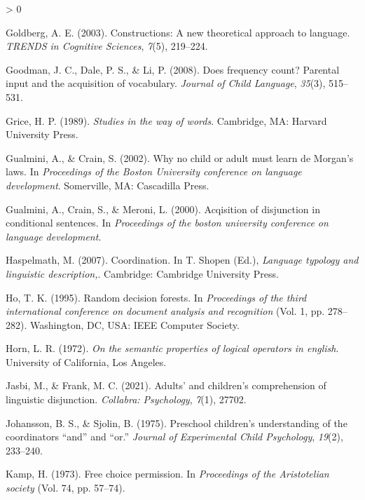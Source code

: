 \documentclass[
  english,
  ,man,floatsintext]{apa6}
\newlength{\cslhangindent}
\newenvironment{CSLReferences}[2] %
 {%
  \setlength{\parindent}{0pt}
  \ifodd #1 \everypar{\setlength{\hangindent}{\cslhangindent}}\ignorespaces\fi
  \ifnum #2 > 0
  \setlength{\parskip}{#2\baselineskip}
  \fi
 }%
 {}
\begin{document}
\begin{CSLReferences}{1}{0}
\leavevmode\hypertarget{ref-goldberg2010constructions}{}%
Goldberg, A. E. (2003). Constructions: A new theoretical approach to language. \emph{{TRENDS} in {C}ognitive {S}ciences}, \emph{7}(5), 219--224.

\leavevmode\hypertarget{ref-goodman2008does}{}%
Goodman, J. C., Dale, P. S., \& Li, P. (2008). Does frequency count? Parental input and the acquisition of vocabulary. \emph{Journal of Child Language}, \emph{35}(3), 515--531.

\leavevmode\hypertarget{ref-grice1989studies}{}%
Grice, H. P. (1989). \emph{Studies in the way of words}. Cambridge, MA: Harvard University Press.

\leavevmode\hypertarget{ref-gualminicrain2002}{}%
Gualmini, A., \& Crain, S. (2002). Why no child or adult must learn de {M}organ's laws. In \emph{Proceedings of the {B}oston {U}niversity conference on language development}. Somerville, MA: Cascadilla Press.

\leavevmode\hypertarget{ref-gualmini2000}{}%
Gualmini, A., Crain, S., \& Meroni, L. (2000). Acqisition of disjunction in conditional sentences. In \emph{Proceedings of the boston university conference on language development}.

\leavevmode\hypertarget{ref-haspelmath2007}{}%
Haspelmath, M. (2007). Coordination. In T. Shopen (Ed.), \emph{Language typology and linguistic description,}. Cambridge: Cambridge University Press.

\leavevmode\hypertarget{ref-ho1995random}{}%
Ho, T. K. (1995). Random decision forests. In \emph{Proceedings of the third international conference on document analysis and recognition} (Vol. 1, pp. 278--282). Washington, DC, USA: {IEEE} Computer Society.

\leavevmode\hypertarget{ref-horn1972semantic}{}%
Horn, L. R. (1972). \emph{On the semantic properties of logical operators in english}. University of California, Los Angeles.

\leavevmode\hypertarget{ref-jasbi2021adults}{}%
Jasbi, M., \& Frank, M. C. (2021). Adults' and children's comprehension of linguistic disjunction. \emph{Collabra: Psychology}, \emph{7}(1), 27702.

\leavevmode\hypertarget{ref-johansson1975preschool}{}%
Johansson, B. S., \& Sjolin, B. (1975). Preschool children's understanding of the coordinators {``and''} and {``or.''} \emph{Journal of Experimental Child Psychology}, \emph{19}(2), 233--240.

\leavevmode\hypertarget{ref-kamp1973free}{}%
Kamp, H. (1973). Free choice permission. In \emph{Proceedings of the {A}ristotelian society} (Vol. 74, pp. 57--74).


\end{CSLReferences}
\end{document}
